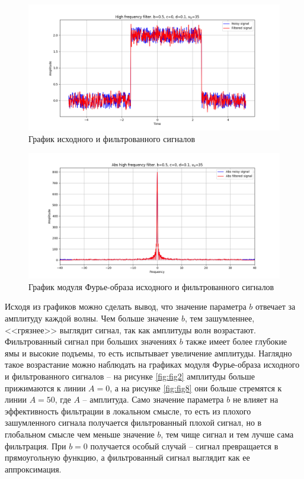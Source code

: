 \documentclass[a4paper, 12pt]{article}
\begin{document}
    \begin{figure}[!htb]
        \centering
        \includegraphics[scale=0.485]{9_u_flt_u_nohigh.png}
        \captionsetup{skip=0pt}
        \caption{График исходного и фильтрованного сигналов}
        \label{fig:fig25}
    \end{figure}
    \begin{figure}[!htb]
        \centering
        \includegraphics[scale=0.485]{9_abs_u_U_nohigh.png}
        \captionsetup{skip=0pt}
        \caption{График модуля Фурье-образа исходного и фильтрованного сигналов}
        \label{fig:fig26}
    \end{figure}


    Исходя из графиков можно сделать вывод, что значение параметра $b$ отвечает за амплитуду каждой волны.
    Чем больше значение $b$, тем зашумленнее, <<грязнее>> выглядит сигнал, так как амплитуды волн возрастают.
    Фильтрованный сигнал при больших значениях $b$ также имеет более глубокие ямы и высокие подъемы, то есть
    испытывает увеличение амплитуды. Наглядно такое возрастание можно наблюдать на графиках модуля Фурье-образа
    исходного и фильтрованного сигналов -- на рисунке \ref{fig:fig2} амплитуды больше прижимаются к линии 
    $A=0$, а на рисунке \ref{fig:fig8} они больше стремятся к линии $A=50$, где $A$ -- амплитуда. Само значение
    параметра $b$ не влияет на эффективность фильтрации в локальном смысле, то есть из плохого зашумленного сигнала
    получается фильтрованный плохой сигнал, но в глобальном смысле чем меньше значение $b$, тем чище сигнал и тем лучше
    сама фильтрация. При $b=0$ получается особый случай -- сигнал превращается в прямоугольную функцию, а фильтрованный
    сигнал выглядит как ее аппроксимация.
\end{document}
